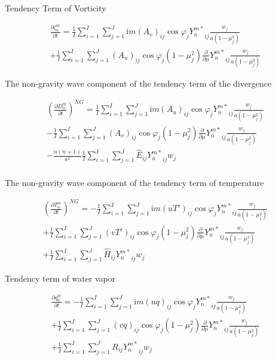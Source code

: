 Tendency Term of Vorticity

\begin{eqnarray}
  \frac{\partial{\zeta_n^m}}{\partial {t}}
    =  \frac{1}{I} \sum_{i=1}^{I} \sum_{j=1}^{J}  
    \mathrm{i}m (A_v)_{ij} \cos \varphi_j
    {Y_n^{m *}}_{ij}
    \frac{w_j}{a(1-\mu_j^{2})}
\\
  +\frac{1}{I} \sum_{i=1}^{I} \sum_{j=1}^{J}  
    (A_u)_{ij} \cos \varphi_j
    (1-\mu_j^2)
    \frac{\partial }{\partial \mu} {Y_n^{m *}}_{ij}
    \frac{w_j}{a(1-\mu_j^{2})}
\end{eqnarray}

The non-gravity wave component of the tendency term of the divergence

\begin{eqnarray}
  \left( \frac{\partial{D_n^m}}{\partial {t}} \right)^{NG}
   =  \frac{1}{I} \sum_{i=1}^{I} \sum_{j=1}^{J}  
          \mathrm{i}m (A_u)_{ij} \cos \varphi_j
          {Y_n^{m *}}_{ij}
         \frac{w_j}{a(1-\mu_j^{2})}
          \\
   -\frac{1}{I} \sum_{i=1}^{I} \sum_{j=1}^{J}  
          (A_v)_{ij} \cos \varphi_j
          (1-\mu_j^2)
          \frac{\partial }{\partial \mu} {Y_n^{m *}}_{ij}
          \frac{w_j}{a(1-\mu_j^{2})}
          \\
   -\frac{n(n+1)}{a^{2}}
         \frac{1}{I} \sum_{i=1}^{I} \sum_{j=1}^{J}  
          \hat{E}_{ij}  {Y_n^{m *}}_{ij} w_j
          \\
\end{eqnarray}

The non-gravity wave component of the tendency term of temperature

\begin{eqnarray}
  \left( \frac{\partial{T_n^m}}{\partial {t}} \right)^{NG}
   =  - \frac{1}{I} \sum_{i=1}^{I} \sum_{j=1}^{J}  
          \mathrm{i}m (u T')_{ij} \cos \varphi_j
          {Y_n^{m *}}_{ij}
         \frac{w_j}{a(1-\mu_j^{2})}
          \\
     + \frac{1}{I} \sum_{i=1}^{I} \sum_{j=1}^{J}  
          (v T')_{ij} \cos \varphi_j
          (1-\mu_j^2)
          \frac{\partial }{\partial \mu} {Y_n^{m *}}_{ij}
          \frac{w_j}{a(1-\mu_j^{2})}
          \\
     + \frac{1}{I} \sum_{i=1}^{I} \sum_{j=1}^{J}  
          \hat{H}_{ij}
          {Y_n^{m *}}_{ij} w_j
\end{eqnarray}

Tendency term of water vapor

\begin{eqnarray}
  \frac{\partial{q_n^m}}{\partial {t}}
   =  - \frac{1}{I} \sum_{i=1}^{I} \sum_{j=1}^{J}  
          \mathrm{i}m (uq)_{ij} \cos \varphi_j
          {Y_n^{m *}}_{ij}
         \frac{w_j}{a(1-\mu_j^{2})}
          \\
     + \frac{1}{I} \sum_{i=1}^{I} \sum_{j=1}^{J}  
          (vq)_{ij} \cos \varphi_j
          (1-\mu_j^2)
          \frac{\partial }{\partial \mu} {Y_n^{m *}}_{ij}
          \frac{w_j}{a(1-\mu_j^{2})}
          \\
     + \frac{1}{I} \sum_{i=1}^{I} \sum_{j=1}^{J}  
          R_{ij}
          {Y_n^{m *}}_{ij} w_j
\end{eqnarray}

